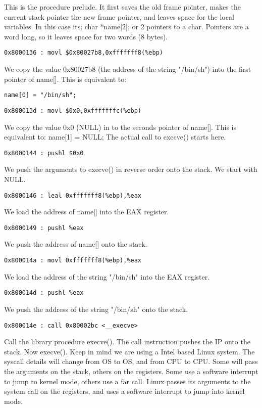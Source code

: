 \documentclass[12pt]{article}
\begin{document}
This is the procedure prelude. It first saves the old frame pointer, makes the current stack pointer the new frame 
pointer, and leaves space for the local variables. In this case its: char *name[2]; or 2 pointers to a char. Pointers 
are a word long, so it leaves space for two words (8 bytes).

\begin{verbatim}
0x8000136 : movl $0x80027b8,0xfffffff8(%ebp)
\end{verbatim}

We copy the value 0x80027b8 (the address of the string "/bin/sh") into the first pointer of name[]. This is 
equivalent to: 

\begin{verbatim}
name[0] = "/bin/sh";
\end{verbatim}

\begin{verbatim}
0x800013d : movl $0x0,0xfffffffc(%ebp)
\end{verbatim}

We copy the value 0x0 (NULL) in to the seconds pointer of name[].  This is equivalent to: name[1] = NULL; 
The actual call to execve() starts here.

\begin{verbatim}
0x8000144 : pushl $0x0
\end{verbatim}

We push the arguments to execve() in reverse order onto the stack. We start with NULL.

\begin{verbatim}
0x8000146 : leal 0xfffffff8(%ebp),%eax
\end{verbatim}

We load the address of name[] into the EAX register.
\begin{verbatim}
0x8000149 : pushl %eax 
\end{verbatim}
We push the address of name[]  onto the stack.
\begin{verbatim}
0x800014a : movl 0xfffffff8(%ebp),%eax
\end{verbatim}
We load the address of the string "/bin/sh" into the EAX register.
\begin{verbatim}
0x800014d : pushl %eax 
\end{verbatim}
We push the address of the string "/bin/sh" onto the stack.
\begin{verbatim}
0x800014e : call 0x80002bc <__execve>
\end{verbatim}
Call the library procedure execve(). The call instruction pushes the IP onto the stack.
Now execve(). Keep in mind we are using a Intel based Linux system. The syscall details will change from OS 
to OS, and from CPU to CPU. Some will pass the arguments on the stack, others on the registers. Some use a 
software interrupt to jump to kernel mode, others use a far call. Linux passes its arguments to the system call on 
the registers, and uses a software interrupt to jump into kernel mode.
\end{document}
